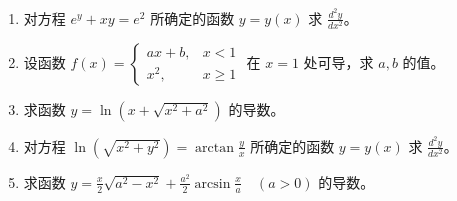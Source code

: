 \documentclass[12pt, a4paper]{article}
\begin{document}
\begin{enumerate}
    \item 对方程 $ e^{y} + xy = e^{2} $ 所确定的函数 $ y = y(x) $ 求 $ \frac{d^{2}y}{dx^{2}} $。

    \item 设函数 $ f(x)=\begin{cases}ax+b, & x<1\\ x^{2}, & x\geq1\end{cases} $ 在 $x=1$ 处可导，求 $a,b$ 的值。

    \item 求函数 $ y = \ln(x + \sqrt{x^{2} + a^{2}}) $ 的导数。

    \item 对方程 $ \ln(\sqrt{x^{2}+y^{2}})=\arctan\frac{y}{x} $ 所确定的函数 $ y=y(x) $ 求 $ \frac{d^{2}y}{dx^{2}} $。

    \item 求函数 $ y = \frac{x}{2} \sqrt{a^{2} - x^{2}} + \frac{a^{2}}{2} \arcsin \frac{x}{a} \quad (a > 0) $ 的导数。
\end{enumerate}
\end{document}
